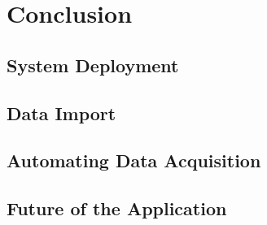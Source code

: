 \chapter{Conclusion}

\section{System Deployment}

\section{Data Import}

\section{Automating Data Acquisition}

\section{Future of the Application}

